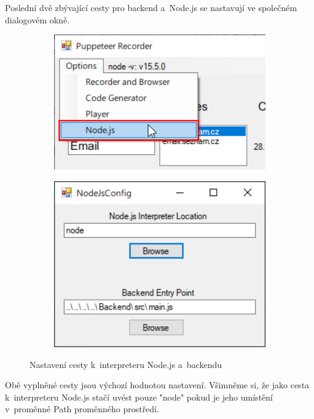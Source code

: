 \documentclass[12pt, a4paper, twoside]{article}
\begin{document}
	\newpage
	Poslední dvě zbývající cesty pro backend a~Node.js se nastavují ve společném dialogovém okně.
	\nopagebreak
	\begin{figure}[H]
		\centering
		\begin{minipage}{0.47\textwidth}
			\begin{subfigure}[t]{1.0\textwidth}
				\includegraphics[width=1.0\textwidth]{nodejsSettings.png}
			\end{subfigure}	
		\end{minipage}
		\hfill
		\textrightarrow
		\hfill
		\begin{minipage}{0.47\textwidth}
			\begin{subfigure}[t]{1.0\textwidth}
				\includegraphics[width=1.0\textwidth, right]{nodejsSettings2.png}
			\end{subfigure}	
		\end{minipage}
		\caption{Nastavení cesty k~interpreteru Node.js a~backendu}
	\end{figure}
	Obě vyplněné cesty jsou výchozí hodnotou nastavení. Všimněme si, že jako cesta k~interpreteru Node.js stačí uvést pouze "node" pokud je jeho umístění v~proměnné Path proměnného prostředí. 
	
\end{document}
